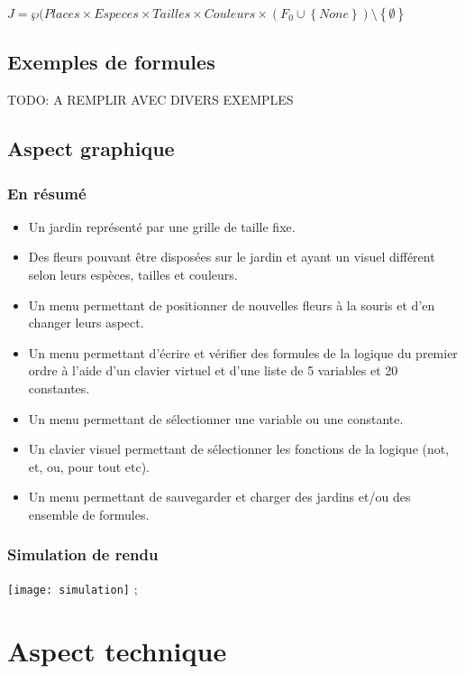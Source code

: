 \documentclass{article}
\theoremstyle{plain}
\theoremstyle{remark}
\begin{document}
  \begin{center}
  $J = \wp(Places \times Especes \times Tailles \times Couleurs \times(F_0 \cup \left \{None\right \})\setminus\left \{\emptyset\right \}$ 
 \end{center}
 
\subsection{Exemples de formules}

TODO: A REMPLIR AVEC DIVERS EXEMPLES

\clearpage
\subsection{Aspect graphique}
\subsubsection{En résumé}
\begin{itemize}
	\item Un jardin représenté par une grille de taille fixe.
	\item Des fleurs pouvant être disposées sur le jardin et ayant un visuel différent selon leurs espèces, tailles et couleurs.
	\item Un menu permettant de positionner de nouvelles fleurs à la souris et d'en changer leurs aspect.
	\item Un menu permettant d'écrire et vérifier des formules de la logique du premier ordre à l'aide d'un clavier virtuel et d'une liste de 5 variables et 20 constantes.
	\item Un menu permettant de sélectionner une variable ou une constante.
	\item Un clavier visuel permettant de sélectionner les fonctions de la logique (not, et, ou, pour tout etc).
	\item Un menu permettant de sauvegarder et charger des jardins et/ou des ensemble de formules.
\end{itemize}

\subsubsection{Simulation de rendu}

\texttt{[image: simulation]} ;

\section{Aspect technique}
\end{document}
